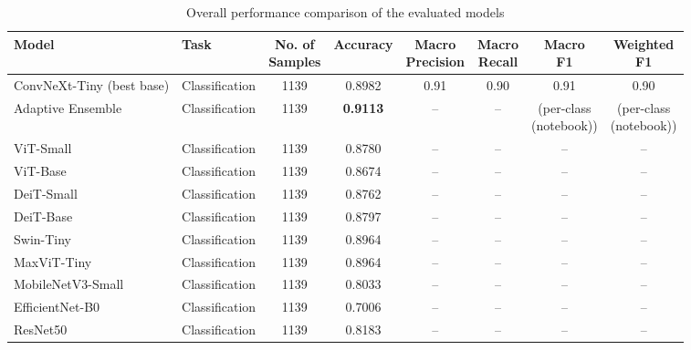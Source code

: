 \documentclass{article}
\begin{document}
\begin{table}[ht]
\centering
\caption{Overall performance comparison of the evaluated models}
\label{tab:overall_model_performance}
\small
\setlength{\tabcolsep}{4pt}
\renewcommand{\arraystretch}{1.30}
\begin{tabular}{
  l
  l
  c
  c
  c
  c
  c
  c
}
\toprule
\textbf{Model} 
& \textbf{Task} 
& \makecell{\textbf{No. of}\\\textbf{Samples}} 
& \textbf{Accuracy} 
& \makecell{\textbf{Macro}\\\textbf{Precision}} 
& \makecell{\textbf{Macro}\\\textbf{Recall}} 
& \makecell{\textbf{Macro}\\\textbf{F1}} 
& \makecell{\textbf{Weighted}\\\textbf{F1}} \\
\toprule
ConvNeXt-Tiny (best base) 
& Classification 
& 1139 
& 0.8982 
& 0.91 
& 0.90 
& 0.91 
& 0.90 \\
\midrule
Adaptive Ensemble 
& Classification 
& 1139 
& \textbf{0.9113} 
& -- 
& -- 
& \makecell{(per-class\\(notebook))} 
& \makecell{(per-class\\(notebook))} \\
\midrule
ViT-Small 
& Classification 
& 1139 
& 0.8780 
& -- 
& -- 
& -- 
& -- \\
\midrule
ViT-Base 
& Classification 
& 1139 
& 0.8674 
& -- 
& -- 
& -- 
& -- \\
\midrule
DeiT-Small 
& Classification 
& 1139 
& 0.8762 
& -- 
& -- 
& -- 
& -- \\
\midrule
DeiT-Base 
& Classification 
& 1139 
& 0.8797 
& -- 
& -- 
& -- 
& -- \\
\midrule
Swin-Tiny 
& Classification 
& 1139 
& 0.8964 
& -- 
& -- 
& -- 
& -- \\
\midrule
MaxViT-Tiny 
& Classification 
& 1139 
& 0.8964 
& -- 
& -- 
& -- 
& -- \\
\midrule
MobileNetV3-Small 
& Classification 
& 1139 
& 0.8033 
& -- 
& -- 
& -- 
& -- \\
\midrule
EfficientNet-B0 
& Classification 
& 1139 
& 0.7006 
& -- 
& -- 
& -- 
& -- \\
\midrule
ResNet50 
& Classification 
& 1139 
& 0.8183 
& -- 
& -- 
& -- 
& -- \\
\bottomrule
\end{tabular}
\end{table}
\end{document}
